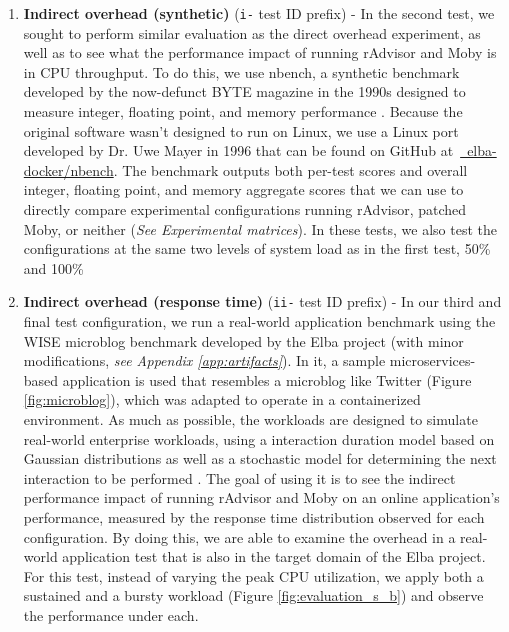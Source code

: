 \documentclass[a4paper,11pt]{article}
\newcommand{\github}[2]{\,\href{https://github.com/#1/#2}{\faGithub~#1/\linebreak[0]#2}\xspace}
\begin{document}
\begin{enumerate}
    \item \textbf{Indirect overhead (synthetic)} (\texttt{i-} test ID prefix) -
    In the second test, we sought to perform similar evaluation as the direct overhead experiment,
    as well as to see what the performance impact of running rAdvisor and Moby is in CPU throughput.
    To do this, we use nbench, a synthetic benchmark developed by the now-defunct BYTE magazine
    in the 1990s designed to measure integer, floating point, and memory performance \cite{nbenchOG}.
    Because the original software wasn't designed to run on Linux,
    we use a Linux port developed by Dr. Uwe Mayer in 1996 \cite{nbench}
    that can be found on GitHub at \github{elba-docker}{nbench}.
    The benchmark outputs both per-test scores and overall integer, floating point, and memory
    aggregate scores that we can use to directly compare experimental configurations running
    rAdvisor, patched Moby, or neither (\textit{See Experimental matrices}).
    In these tests, we also test the configurations at the same two levels of system load
    as in the first test, 50\% and 100\%
    
    \item \textbf{Indirect overhead (response time)} (\texttt{ii-} test ID prefix) -
    In our third and final test configuration, we run a real-world application benchmark
    using the WISE microblog benchmark developed by the Elba project
    (with minor modifications, \textit{see Appendix \ref{app:artifacts}}).
    In it, a sample microservices-based application is used that resembles a microblog like Twitter \cite{microblog}
    (Figure \ref{fig:microblog}),
    which was adapted to operate in a containerized environment.
    As much as possible, the workloads are designed to simulate real-world enterprise workloads,
    using a interaction duration model based on Gaussian distributions
    as well as a stochastic model for determining the next interaction to be performed \cite{microblog}.
    The goal of using it is to see the indirect performance impact
    of running rAdvisor and Moby on an online application's performance,
    measured by the response time distribution observed for each configuration.
    By doing this, we are able to examine the overhead in a real-world application test
    that is also in the target domain of the Elba project.
    For this test, instead of varying the peak CPU utilization,
    we apply both a sustained and a bursty workload (Figure \ref{fig:evaluation_s_b})
    and observe the performance under each.
    

\end{enumerate}
\end{document}

